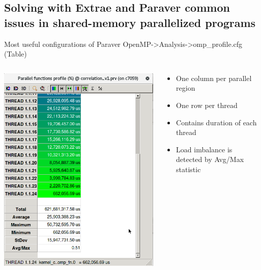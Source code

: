 \documentclass[10pt,xcolor=table]{beamer}
\begin{document}
\subsection{Solving with Extrae and Paraver common issues in shared-memory parallelized programs}

\begin{frame}{Most useful configurations of Paraver}
\centering
OpenMP->Analysis->omp\_profile.cfg (Table)

\begin{columns}
\begin{column}{0.5\textwidth}
\includegraphics[width=\textwidth]{figs/omp_profile_table.png}
\end{column}
\begin{column}{0.5\textwidth}
  \begin{itemize}
      \item One column per parallel region
      \item One row per thread
      \item Contains duration of each thread
      \item Load imbalance is detected by Avg/Max statistic
  \end{itemize}
\end{column}
\end{columns}
\end{frame}
\end{document}

